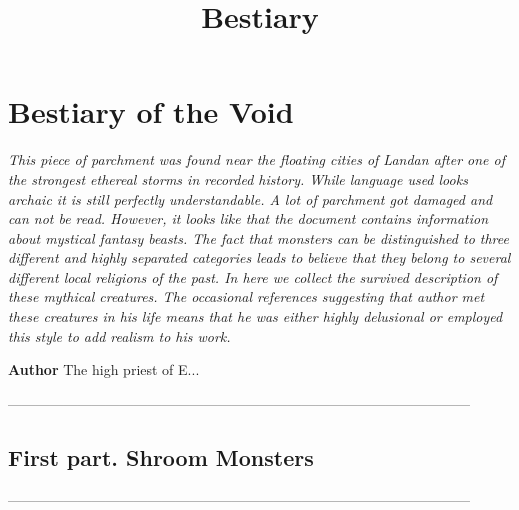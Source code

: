 \documentclass[14p]{book}
\begin{document}
\title{Bestiary}
\maketitle

\chapter{Bestiary of the Void}

\emph{This piece of parchment was found near the floating cities of Landan after one of the strongest ethereal storms in recorded history. While language used looks archaic it is still perfectly understandable. A lot of parchment got damaged and can not be read. However, it looks like that the document contains information about mystical fantasy beasts. The fact that monsters can be distinguished to three different and highly separated categories leads to believe that they belong to several different local religions of the past. In here we collect the survived description of these mythical creatures. The occasional references suggesting that author met these creatures in his life means that he was either highly delusional or employed this style to add realism to his work.}

\textbf{Author} The high priest of E...

{\color{l} ---------------------------------------------------------------------------------------------------\\}

\section{First part. Shroom Monsters}
{\color{l} ---------------------------------------------------------------------------------------------------\\}
\end{document}
